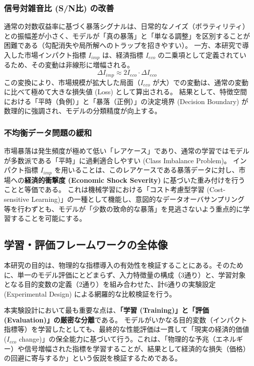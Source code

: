 \documentclass[11pt,a4paper,oneside]{ltjsarticle}
\begin{document}
\subsubsection{信号対雑音比 (S/N比) の改善}
通常の対数収益率に基づく暴落シグナルは、日常的なノイズ（ボラティリティ）との振幅差が小さく、モデルが「真の暴落」と「単なる調整」を区別することが困難である（勾配消失や局所解へのトラップを招きやすい）。
一方、本研究で導入した市場インパクト指標 $I_{imp}$ は、経済指標 $I_{eco}$ の二乗項として定義されているため、その変動は非線形に増幅される。
\begin{equation}
    \Delta I_{imp} \approx 2 I_{eco} \cdot \Delta I_{eco}
\end{equation}
この変換により、市場規模が拡大した局面（$I_{eco}$ が大）での変動は、通常の変動に比べて極めて大きな損失値 (Loss) として算出される。
結果として、特徴空間における「平時（負例）」と「暴落（正例）」の決定境界 (Decision Boundary) が数理的に強調され、モデルの分類精度が向上する。

\subsubsection{不均衡データ問題の緩和}
市場暴落は発生頻度が極めて低い「レアケース」であり、通常の学習ではモデルが多数派である「平時」に過剰適合しやすい (Class Imbalance Problem)。
インパクト指標 $I_{imp}$ を用いることは、このレアケースである暴落データに対し、市場への\textbf{経済的衝撃度 (Economic Shock Severity)} に基づいた重み付けを行うことと等価である。
これは機械学習における「コスト考慮型学習 (Cost-sensitive Learning)」の一種として機能し、意図的なデータオーバサンプリング等を行わずとも、モデルが「少数の致命的な暴落」を見逃さないよう重点的に学習することを可能にする。

\subsection{学習・評価フレームワークの全体像}
本研究の目的は、物理的な指標導入の有効性を検証することにある。そのために、単一のモデル評価にとどまらず、入力特徴量の構成（3通り）と、学習対象となる目的変数の定義（2通り）を組み合わせた、計6通りの実験設定 (Experimental Design) による網羅的な比較検証を行う。

本実験設計において最も重要な点は、\textbf{「学習 (Training)」と「評価 (Evaluation)」の厳密な分離}である。
モデルがいかなる目的変数（インパクト指標等）を学習したとしても、最終的な性能評価は一貫して「現実の経済的価値 ($I_{eco}$ change)」の保全能力に基づいて行う。これは、「物理的な予兆（エネルギー）や信号増幅された指標を学習することが、結果として経済的な損失（価格）の回避に寄与するか」という仮説を検証するためである。
\end{document}
